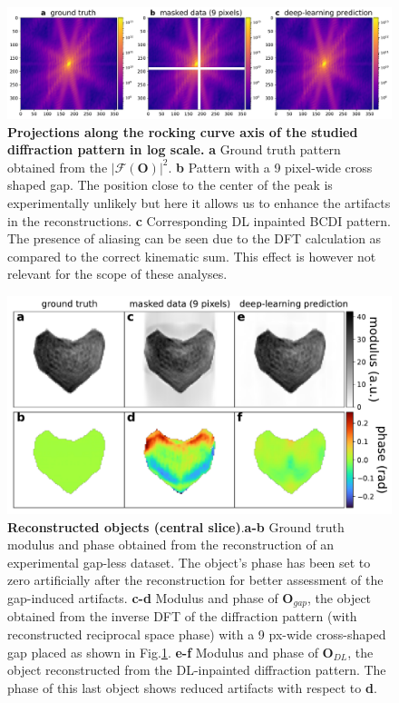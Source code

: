 \begin{figure}[H]
    \centering
    \includegraphics[width=\textwidth]{figures/Inpainting/Carnis_Diffractions_comparison_9px_version2.pdf}
    \caption{\textbf{Projections along the rocking curve axis of the studied diffraction pattern in log scale.} \textbf{a} Ground truth
    pattern obtained from the $|\mathcal{F}(\mathbf{O})|^2$. \textbf{b} Pattern with a 9 pixel-wide cross shaped gap. The position close to the center of 
    the peak is experimentally unlikely but here it allows us to enhance the artifacts in the reconstructions. \textbf{c} 
    Corresponding DL inpainted BCDI pattern. The presence of aliasing can be seen  due to the DFT calculation as compared 
    to the correct kinematic sum. This effect is however not relevant for the scope of these analyses.}
    \label{fig:Carnis_int}
\end{figure}

\begin{figure}[H]
    \centering
    \includegraphics[width=\textwidth]{figures/Inpainting/Real_space_comparison_axis0-1.pdf}
    \caption{\textbf{Reconstructed objects (central slice)}.\textbf{a-b} Ground truth modulus and phase obtained from the reconstruction 
    of an experimental gap-less dataset. The object's phase has been set to zero artificially after the reconstruction for 
    better assessment of the gap-induced artifacts. \textbf{c-d} Modulus and phase of  
    $\mathbf{O}_{gap}$, the object obtained from the inverse DFT of the diffraction pattern (with reconstructed reciprocal 
    space phase) with a 9 px-wide cross-shaped gap placed as shown in Fig.\ref{fig:Carnis_int}. \textbf{e-f} Modulus 
    and phase of $\mathbf{O}_{DL}$, the object reconstructed from the DL-inpainted diffraction pattern. The phase of this 
    last object shows reduced artifacts with respect to \textbf{d}.}
    \label{fig:Carnis_obj}
\end{figure} 

